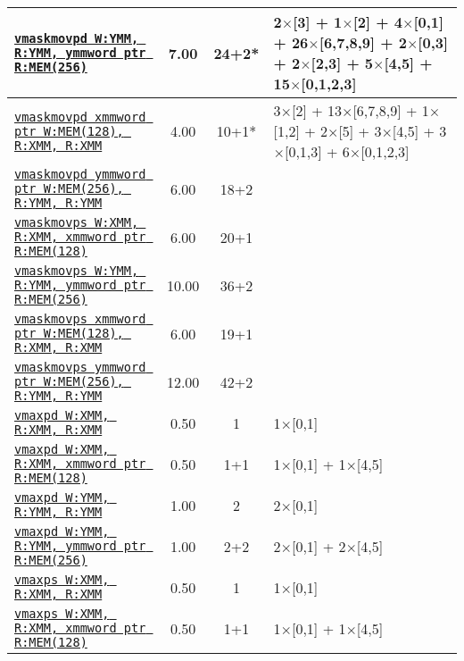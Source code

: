 \documentclass[a4paper,english,fontsize=9]{scrartcl}
\begin{document}
\begin{longtable}{p{}ccL{.25\textwidth}}
  \midrule
  \texttt{\href{https://felixcloutier.com/x86/VMASKMOV.html}{vmaskmovpd W:YMM, R:YMM, ymmword ptr R:MEM(256)}} & 7.00 & 24+2* & 2\(\times\)[3] + 1\(\times\)[2] + 4\(\times\)[0,1] + 26\(\times\)[6,7,8,9] + 2\(\times\)[0,3] + 2\(\times\)[2,3] + 5\(\times\)[4,5] + 15\(\times\)[0,1,2,3] \\
  \midrule
  \texttt{\href{https://felixcloutier.com/x86/VMASKMOV.html}{vmaskmovpd xmmword ptr W:MEM(128), R:XMM, R:XMM}} & 4.00 & 10+1* & 3\(\times\)[2] + 13\(\times\)[6,7,8,9] + 1\(\times\)[1,2] + 2\(\times\)[5] + 3\(\times\)[4,5] + 3\(\times\)[0,1,3] + 6\(\times\)[0,1,2,3] \\
  \midrule
  \texttt{\href{https://felixcloutier.com/x86/VMASKMOV.html}{vmaskmovpd ymmword ptr W:MEM(256), R:YMM, R:YMM}} & 6.00 & 18+2 &  \\
  \midrule
  \texttt{\href{https://felixcloutier.com/x86/VMASKMOV.html}{vmaskmovps W:XMM, R:XMM, xmmword ptr R:MEM(128)}} & 6.00 & 20+1 &  \\
  \midrule
  \texttt{\href{https://felixcloutier.com/x86/VMASKMOV.html}{vmaskmovps W:YMM, R:YMM, ymmword ptr R:MEM(256)}} & 10.00 & 36+2 &  \\
  \midrule
  \texttt{\href{https://felixcloutier.com/x86/VMASKMOV.html}{vmaskmovps xmmword ptr W:MEM(128), R:XMM, R:XMM}} & 6.00 & 19+1 &  \\
  \midrule
  \texttt{\href{https://felixcloutier.com/x86/VMASKMOV.html}{vmaskmovps ymmword ptr W:MEM(256), R:YMM, R:YMM}} & 12.00 & 42+2 &  \\
  \midrule
  \texttt{\href{https://felixcloutier.com/x86/MAXPD.html}{vmaxpd W:XMM, R:XMM, R:XMM}} & 0.50 & 1 & 1\(\times\)[0,1] \\
  \midrule
  \texttt{\href{https://felixcloutier.com/x86/MAXPD.html}{vmaxpd W:XMM, R:XMM, xmmword ptr R:MEM(128)}} & 0.50 & 1+1 & 1\(\times\)[0,1] + 1\(\times\)[4,5] \\
  \midrule
  \texttt{\href{https://felixcloutier.com/x86/MAXPD.html}{vmaxpd W:YMM, R:YMM, R:YMM}} & 1.00 & 2 & 2\(\times\)[0,1] \\
  \midrule
  \texttt{\href{https://felixcloutier.com/x86/MAXPD.html}{vmaxpd W:YMM, R:YMM, ymmword ptr R:MEM(256)}} & 1.00 & 2+2 & 2\(\times\)[0,1] + 2\(\times\)[4,5] \\
  \midrule
  \texttt{\href{https://felixcloutier.com/x86/MAXPS.html}{vmaxps W:XMM, R:XMM, R:XMM}} & 0.50 & 1 & 1\(\times\)[0,1] \\
  \midrule
  \texttt{\href{https://felixcloutier.com/x86/MAXPS.html}{vmaxps W:XMM, R:XMM, xmmword ptr R:MEM(128)}} & 0.50 & 1+1 & 1\(\times\)[0,1] + 1\(\times\)[4,5] \\

\end{longtable}
\end{document}
